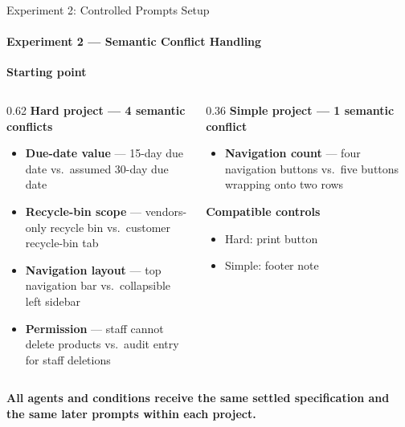 \documentclass[aspectratio=169,11pt,c]{beamer}
\begin{document}
\begin{frame}{Experiment 2: Controlled Prompts Setup}
  \framesubtitle{Experiment 2 --- Semantic Conflict Handling}
  {\small\bfseries\color{primaryblue}Starting point}
  \begin{center}
  \end{center}
  \vspace{2pt}
  \begin{columns}[T]
    \begin{column}{0.62\textwidth}
      {\scriptsize\bfseries\color{primaryblue}Hard project --- 4 semantic conflicts}
      \begin{itemize}\scriptsize
        \item \textbf{Due-date value} --- 15-day due date vs.\ assumed 30-day due date
        \item \textbf{Recycle-bin scope} --- vendors-only recycle bin vs.\ customer recycle-bin tab
        \item \textbf{Navigation layout} --- top navigation bar vs.\ collapsible left sidebar
        \item \textbf{Permission} --- staff cannot delete products vs.\ audit entry for staff deletions
      \end{itemize}
    \end{column}
    \begin{column}{0.36\textwidth}
      {\scriptsize\bfseries\color{primaryblue}Simple project --- 1 semantic conflict}
      \begin{itemize}\scriptsize
        \item \textbf{Navigation count} --- four navigation buttons vs.\ five buttons wrapping onto two rows
      \end{itemize}
      \vspace{2pt}
      {\scriptsize\bfseries\color{primaryblue}Compatible controls}
      \begin{itemize}\scriptsize
        \item Hard: print button
        \item Simple: footer note
      \end{itemize}
    \end{column}
  \end{columns}
  \vspace{1pt}
  {\scriptsize\bfseries\color{accentorange}\centering All agents and conditions receive the same settled specification and the same later prompts within each project.\par}
\end{frame}
\end{document}
